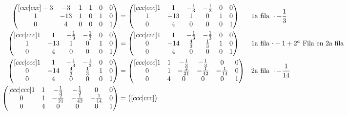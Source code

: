 \documentclass[letterpaper]{article}
\renewcommand{\*}{\cdot}
\theoremstyle{definition}
\begin{document}
\begin{align*}
	\begin{pmatrix}[ccc|ccc]
	-3 & -3 & 1 & 1 & 0 & 0\\
	1 & -13 & 1 & 0 & 1 & 0\\
	0 & 4 & 0 & 0 & 0 & 1
	\end{pmatrix} &= \begin{pmatrix}[ccc|ccc]
	1 & 1 & -\frac{1}{3} & -\frac{1}{3} & 0 & 0\\
	1 & -13 & 1 & 0 & 1 & 0\\
	0 & 4 & 0 & 0 & 0 & 1
	\end{pmatrix} && \text{1a fila } \* -\frac{1}{3}\\
	\begin{pmatrix}[ccc|ccc]
	1 & 1 & -\frac{1}{3} & -\frac{1}{3} & 0 & 0\\
	1 & -13 & 1 & 0 & 1 & 0\\
	0 & 4 & 0 & 0 & 0 & 1
	\end{pmatrix} &= \begin{pmatrix}[ccc|ccc]
	1 & 1 & -\frac{1}{3} & -\frac{1}{3} & 0 & 0\\
	0 & -14 & \frac{4}{3} & \frac{1}{3} & 1 & 0\\
	0 & 4 & 0 & 0 & 0 & 1
	\end{pmatrix} && \text{1a fila $ \* -1 + 2^a$ Fila en 2a fila }\\
	\begin{pmatrix}[ccc|ccc]
	1 & 1 & -\frac{1}{3} & -\frac{1}{3} & 0 & 0\\
	0 & -14 & \frac{4}{3} & \frac{1}{3} & 1 & 0\\
	0 & 4 & 0 & 0 & 0 & 1
	\end{pmatrix} &= \begin{pmatrix}[ccc|ccc]
	1 & 1 & -\frac{1}{3} & -\frac{1}{3} & 0 & 0\\
	0 & 1 & -\frac{2}{21} & -\frac{1}{42} & -\frac{1}{14} & 0\\
	0 & 4 & 0 & 0 & 0 & 1
	\end{pmatrix} && \text{2a fila } \* - \frac{1}{14}\\
	\begin{pmatrix}[ccc|ccc]
	1 & 1 & -\frac{1}{3} & -\frac{1}{3} & 0 & 0\\
	0 & 1 & -\frac{2}{21} & -\frac{1}{42} & -\frac{1}{14} & 0\\
	0 & 4 & 0 & 0 & 0 & 1
	\end{pmatrix}  &= \begin{pmatrix}[ccc|ccc]

\end{pmatrix}
\end{align*}
\end{document}
